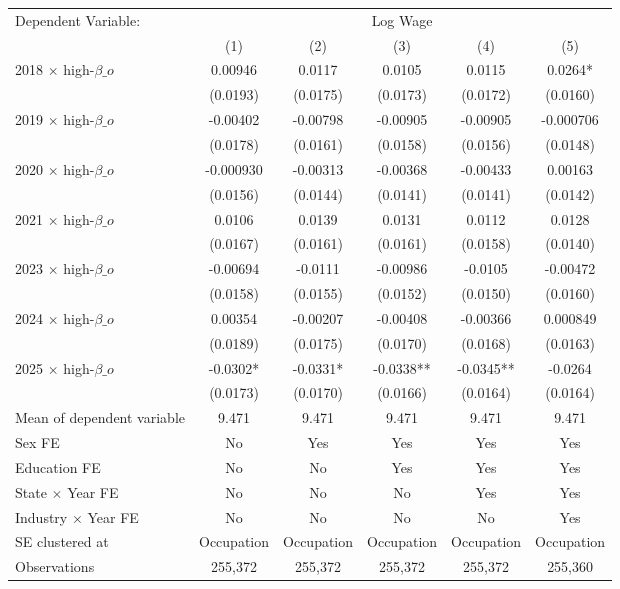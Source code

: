 \def\sym#1{\ifmmode^{#1}\else\(^{#1}\)\fi}
\begin{tabular}{l*{5}{c}}
\toprule
Dependent Variable: & \multicolumn{5}{c}{Log Wage} \\
\cmidrule(lr){2-6}
 & (1) & (2) & (3) & (4) & (5) \\
\midrule
2018 $\times$ high-$\beta\_o$&     0.00946   &      0.0117   &      0.0105   &      0.0115   &      0.0264*  \\
            &    (0.0193)   &    (0.0175)   &    (0.0173)   &    (0.0172)   &    (0.0160)   \\
2019 $\times$ high-$\beta\_o$&    -0.00402   &    -0.00798   &    -0.00905   &    -0.00905   &   -0.000706   \\
            &    (0.0178)   &    (0.0161)   &    (0.0158)   &    (0.0156)   &    (0.0148)   \\
2020 $\times$ high-$\beta\_o$&   -0.000930   &    -0.00313   &    -0.00368   &    -0.00433   &     0.00163   \\
            &    (0.0156)   &    (0.0144)   &    (0.0141)   &    (0.0141)   &    (0.0142)   \\
2021 $\times$ high-$\beta\_o$&      0.0106   &      0.0139   &      0.0131   &      0.0112   &      0.0128   \\
            &    (0.0167)   &    (0.0161)   &    (0.0161)   &    (0.0158)   &    (0.0140)   \\
2023 $\times$ high-$\beta\_o$&    -0.00694   &     -0.0111   &    -0.00986   &     -0.0105   &    -0.00472   \\
            &    (0.0158)   &    (0.0155)   &    (0.0152)   &    (0.0150)   &    (0.0160)   \\
2024 $\times$ high-$\beta\_o$&     0.00354   &    -0.00207   &    -0.00408   &    -0.00366   &    0.000849   \\
            &    (0.0189)   &    (0.0175)   &    (0.0170)   &    (0.0168)   &    (0.0163)   \\
2025 $\times$ high-$\beta\_o$&     -0.0302*  &     -0.0331*  &     -0.0338** &     -0.0345** &     -0.0264   \\
            &    (0.0173)   &    (0.0170)   &    (0.0166)   &    (0.0164)   &    (0.0164)   \\
\midrule
Mean of dependent variable&       9.471   &       9.471   &       9.471   &       9.471   &       9.471   \\
Sex FE      &          No   &         Yes   &         Yes   &         Yes   &         Yes   \\
Education FE&          No   &          No   &         Yes   &         Yes   &         Yes   \\
State $\times$ Year FE&          No   &          No   &          No   &         Yes   &         Yes   \\
Industry $\times$ Year FE&          No   &          No   &          No   &          No   &         Yes   \\
SE clustered at&  Occupation   &  Occupation   &  Occupation   &  Occupation   &  Occupation   \\
Observations&     255,372   &     255,372   &     255,372   &     255,372   &     255,360   \\
\bottomrule
\end{tabular}
